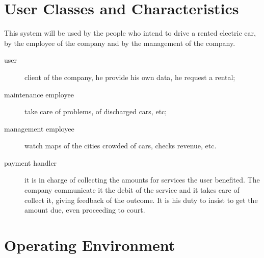 \documentclass{scrreprt}
\begin{document}
\section{User Classes and Characteristics}
This system will be used by the people who intend to drive a rented electric car, by the employee of the company and by the management of the company.
\begin{description}
\item [user] client of the company, he provide his own data, he request a rental;
\item [maintenance employee] take care of problems, of discharged cars, etc;
\item [management employee] watch maps of the cities crowded of cars, checks revenue, etc.
\item [payment handler] it is in charge of collecting the amounts for services the user benefited. The company communicate it the debit of the service and it takes care of collect it, giving feedback of the outcome. It is his duty to insist to get the amount due, even proceeding to court.
\end{description}
\begin{comment}$<$Identify the various user classes that you anticipate will use this product.  
User classes may be differentiated based on frequency of use, subset of product 
functions used, technical expertise, security or privilege levels, educational 
level, or experience. Describe the pertinent characteristics of each user class.  
Certain requirements may pertain only to certain user classes. Distinguish the 
most important user classes for this product from those who are less important 
to satisfy.$>$
\end{comment}

\section{Operating Environment}
\begin{comment}$<$Describe the environment in which the software will operate, including the hardware platform, operating system and versions, and any other software 
components or applications with which it must peacefully coexist.$>$
\end{comment}
\end{document}
